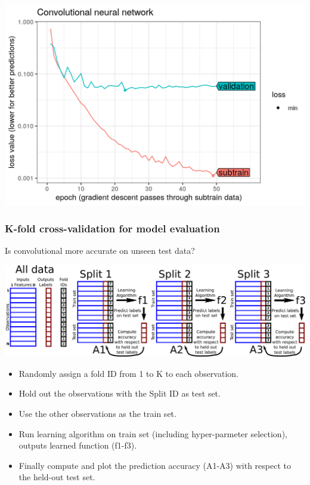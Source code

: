 \documentclass{beamer}
\begin{document}
\begin{frame}
  \includegraphics[width=\textwidth]{figure-validation-loss-conv}
\end{frame}
 
\begin{frame}
  \frametitle{K-fold cross-validation for model evaluation}
  Is convolutional more accurate on unseen test data?
  
  \includegraphics[width=\textwidth]{drawing-cross-validation}
  
  \begin{itemize}
  \item Randomly assign a fold ID from 1 to K to each observation.
  \item Hold out the observations with the Split ID as test set.
  \item Use the other observations as the train set.
  \item Run learning algorithm on train set (including hyper-parmeter
    selection), outputs learned function (f1-f3).
  \item Finally compute and plot the prediction accuracy (A1-A3) with
    respect to the held-out test set.
  \end{itemize}
\end{frame}
\end{document}
